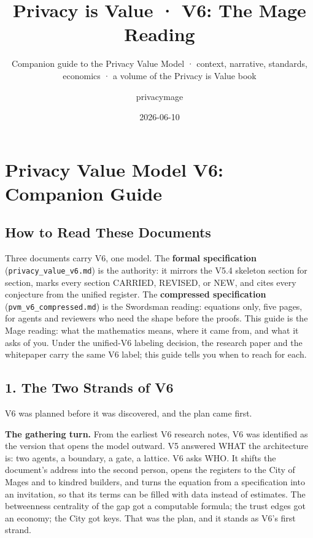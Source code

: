 \documentclass[
  11pt,
]{article}
\title{Privacy is Value · V6: The Mage Reading}
\subtitle{Companion guide to the Privacy Value Model · context,
narrative, standards, economics · a volume of the Privacy is Value book}
\author{privacymage}
\date{2026-06-10}
\begin{document}
\maketitle

\section{Privacy Value Model V6: Companion
Guide}\label{privacy-value-model-v6-companion-guide}

\subsection{How to Read These
Documents}\label{how-to-read-these-documents}

Three documents carry V6, one model. The \textbf{formal specification}
(\texttt{privacy\_value\_v6.md}) is the authority: it mirrors the V5.4
skeleton section for section, marks every section CARRIED, REVISED, or
NEW, and cites every conjecture from the unified register. The
\textbf{compressed specification} (\texttt{pvm\_v6\_compressed.md}) is
the Swordsman reading: equations only, five pages, for agents and
reviewers who need the shape before the proofs. This guide is the Mage
reading: what the mathematics means, where it came from, and what it
asks of you. Under the unified-V6 labeling decision, the research paper
and the whitepaper carry the same V6 label; this guide tells you when to
reach for each.

\subsection{1. The Two Strands of V6}\label{the-two-strands-of-v6}

V6 was planned before it was discovered, and the plan came first.

\textbf{The gathering turn.} From the earliest V6 research notes, V6 was
identified as the version that opens the model outward. V5 answered WHAT
the architecture is: two agents, a boundary, a gate, a lattice. V6 asks
WHO. It shifts the document's address into the second person, opens the
registers to the City of Mages and to kindred builders, and turns the
equation from a specification into an invitation, so that its terms can
be filled with data instead of estimates. The betweenness centrality of
the gap got a computable formula; the trust edges got an economy; the
City got keys. That was the plan, and it stands as V6's first strand.
\end{document}
